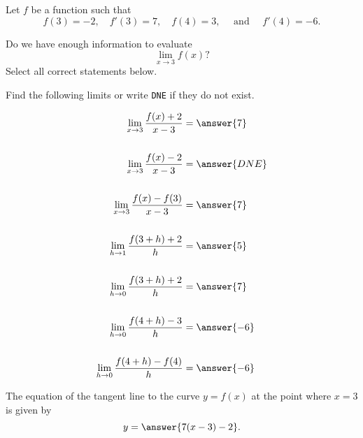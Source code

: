 \documentclass{ximera}
\author{Nela Lakos \and Kyle Parsons}
\begin{document}
\begin{exercise}

Let $f$ be a function such that 
\[
f(3)=-2,\quad f'(3)=7,\quad f(4)=3, \quad \text{ and  } \quad f'(4)=-6.
\]

Do we have enough information to evaluate
\[
\lim_{x\to3}f(x)?
\]
Select all correct statements below.

\begin{selectAll}
\end{selectAll}

\begin{exercise}

Find the following limits or write \verb|DNE| if they do not exist.

\begin{align*}
\lim_{x\to3}\frac{f(x) + 2}{x - 3} &= \answer{7}\\ \\
\lim_{x\to3}\frac{f(x) - 2}{x - 3} &= \answer{DNE}\\ \\
\lim_{x\to3}\frac{f(x) - f(3)}{x-3} &= \answer{7}\\ \\
\lim_{h\to1}\frac{f(3+h) + 2}{h} &= \answer{5}\\ \\
\lim_{h\to0}\frac{f(3+h) + 2}{h} &= \answer{7}\\ \\
\lim_{h\to0}\frac{f(4+h) - 3}{h} &= \answer{-6}\\ \\
\lim_{h\to0}\frac{f(4+h) - f(4)}{h} &= \answer{-6}
\end{align*}

\begin{exercise}

The equation of the tangent line to the curve $y = f(x)$ at the point where $x = 3$ is given by
\[
y = \answer{7(x-3) - 2}.
\]

\end{exercise}
\end{exercise}
\end{exercise}
\end{document}
